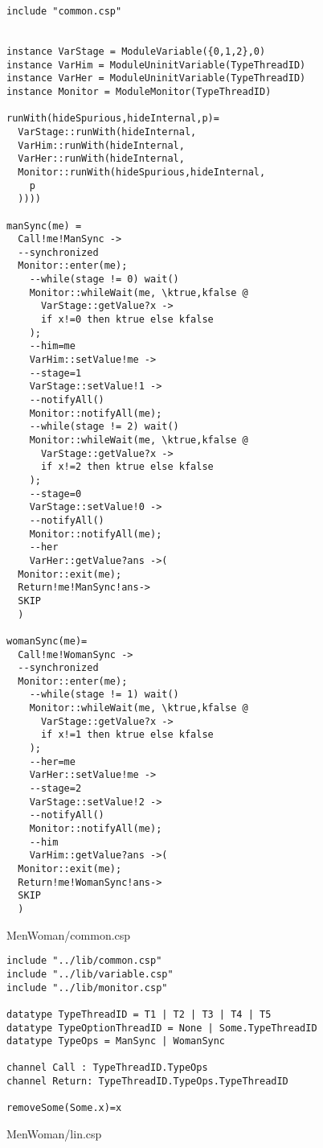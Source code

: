 \begin{lstlisting}
include "common.csp"


instance VarStage = ModuleVariable({0,1,2},0) 
instance VarHim = ModuleUninitVariable(TypeThreadID)
instance VarHer = ModuleUninitVariable(TypeThreadID)
instance Monitor = ModuleMonitor(TypeThreadID)

runWith(hideSpurious,hideInternal,p)=
  VarStage::runWith(hideInternal,
  VarHim::runWith(hideInternal,
  VarHer::runWith(hideInternal,
  Monitor::runWith(hideSpurious,hideInternal,
    p
  ))))

manSync(me) = 
  Call!me!ManSync ->
  --synchronized
  Monitor::enter(me);
    --while(stage != 0) wait()
    Monitor::whileWait(me, \ktrue,kfalse @
      VarStage::getValue?x ->
      if x!=0 then ktrue else kfalse
    );
    --him=me
    VarHim::setValue!me ->
    --stage=1
    VarStage::setValue!1 ->
    --notifyAll()
    Monitor::notifyAll(me);
    --while(stage != 2) wait()
    Monitor::whileWait(me, \ktrue,kfalse @
      VarStage::getValue?x ->
      if x!=2 then ktrue else kfalse
    );
    --stage=0
    VarStage::setValue!0 ->
    --notifyAll()
    Monitor::notifyAll(me);
    --her
    VarHer::getValue?ans ->(
  Monitor::exit(me);
  Return!me!ManSync!ans->
  SKIP
  )

womanSync(me)=
  Call!me!WomanSync ->
  --synchronized
  Monitor::enter(me);
    --while(stage != 1) wait()
    Monitor::whileWait(me, \ktrue,kfalse @
      VarStage::getValue?x ->
      if x!=1 then ktrue else kfalse
    );
    --her=me
    VarHer::setValue!me ->
    --stage=2
    VarStage::setValue!2 ->
    --notifyAll()
    Monitor::notifyAll(me);
    --him
    VarHim::getValue?ans ->(
  Monitor::exit(me);
  Return!me!WomanSync!ans->
  SKIP
  )
\end{lstlisting}
MenWoman/common.csp
\begin{lstlisting}
include "../lib/common.csp"
include "../lib/variable.csp"
include "../lib/monitor.csp"

datatype TypeThreadID = T1 | T2 | T3 | T4 | T5
datatype TypeOptionThreadID = None | Some.TypeThreadID
datatype TypeOps = ManSync | WomanSync

channel Call : TypeThreadID.TypeOps
channel Return: TypeThreadID.TypeOps.TypeThreadID

removeSome(Some.x)=x
\end{lstlisting}
MenWoman/lin.csp

